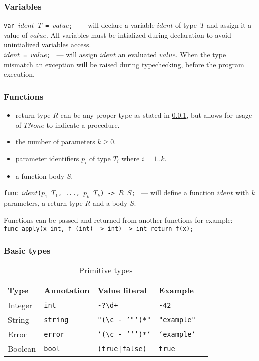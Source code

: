 \documentclass{article}
\begin{document}
\subsubsection{Variables}
\label{variables}
\texttt{var $ident$ $T$ = $value$; } --- will declare a variable $ident$ of
type~$T$ and assign it a value of $value$. All variables must be intialized
during declaration to avoid unintialized variables access. \\
\texttt{$ident$ = $value$; } --- will assign $ident$ an evaluated $value$. When
the type mismatch an exception will be raised during typechecking, before the
program execution.

\subsubsection{Functions}
\label{def-functions}
\begin{itemize}
  \setlength\itemsep{.1em}
  \item return type $R$ can be any proper type as stated in \ref{variables}, but
    allows for usage of $TNone$ to indicate a procedure.
  \item the number of parameters $k \geq 0$.
  \item parameter identifiers $p_i$ of type $T_i$ where $i = 1..k$.
  \item a function body $S$.
\end{itemize}

\texttt{func $ident$($p_1$ $T_1$, ..., $p_k$ $T_k$) -> $R$ $S$; } --- will
define a function $ident$ with $k$ parameters, a return type $R$ and a body $S$.

Functions can be passed and returned from another functions for example: \\
\texttt{func apply(x int, f (int) -> int) -> int return f(x); }

\subsubsection{Basic types}

\begin{table}[h]
\centering
\label{primitive-types}
\begin{tabular}{|l|l|l|l|l|} \hline
\textbf{Type} & \textbf{Annotation} & \textbf{Value literal}               & \textbf{Example}   \\ \hline
Integer       & \texttt{int}        & \texttt{-?\textbackslash d+}         & \texttt{-42}       \\ \hline
String        & \texttt{string}     & \texttt{"(\textbackslash c - '"')*"} & \texttt{"example"} \\ \hline
Error         & \texttt{error}      & \texttt{`(\textbackslash c - '`')*`} & \texttt{`example`} \\ \hline
Boolean       & \texttt{bool}       & \texttt{(true|false)}                & \texttt{true}      \\ \hline
\end{tabular}
\caption{Primitive types}
\end{table}
\end{document}
